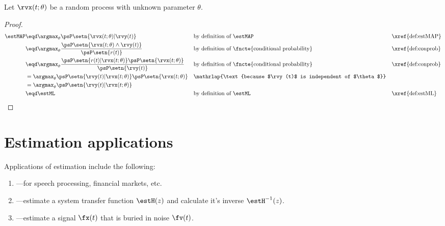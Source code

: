 \begin{theorem}
\label{thm:map=ml}
Let $\rvx(t;\theta)$ be a random process with unknown parameter $\theta$.
\end{theorem}
\begin{proof}
\begin{align*}
   \estMAP
     &\eqd \argmax_{\theta} \psP\setn{\rvx(t;\theta)|\rvy(t)}
     &&    \text{by definition of $\estMAP$}
     &&    \text{\xref{def:estMAP}}
   \\&\eqd \argmax_{\theta} \frac{\psP\setn{\rvx(t;\theta) \land \rvy(t)}}
                               {\psP\setn{r(t)}}
     && \text{by definition of \fncte{conditional probability}}
     && \text{\xref{def:conprob}}
   \\&\eqd \argmax_{\theta} \frac{\psP\setn{r(t) | \rvx(t;\theta) }\psP\setn{\rvx(t;\theta) }}
                               {\psP\setn{\rvy(t)}}
     && \text{by definition of \fncte{conditional probability}}
     && \text{\xref{def:conprob}}
   \\&=    \argmax_{\theta} \psP\setn{\rvy(t) | \rvx(t;\theta) }\psP\setn{\rvx(t;\theta)}
     &&\mathrlap{\text{because $\rvy(t)$ is independent of $\theta$}}
   \\&=    \argmax_{\theta} \psP\setn{\rvy(t) | \rvx(t;\theta) }
   \\&\eqd \estML
     &&  \text{by definition of $\estML$}
     &&  \text{\xref{def:estML}}
\end{align*}
\end{proof}

\section{Estimation applications}
Applications of estimation include the following:
\begin{enumerate}
  \item {}---for speech processing, financial markets, etc.
  \item {}---estimate a system transfer function $\estH(z)$ and calculate it's inverse $\estH^{-1}(z)$.
  \item {}---estimate a signal $\fx(t)$ that is buried in noise $\fv(t)$.
\end{enumerate}

